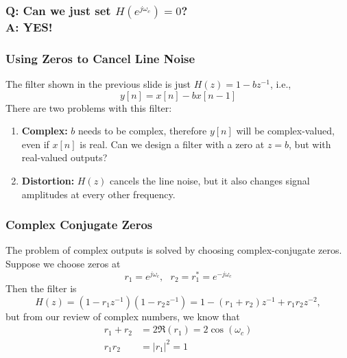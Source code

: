 \documentclass{beamer}
\begin{document}
\begin{frame}
  \frametitle{{\bf Q}: Can we just set $H(e^{j\omega_c})=0$?\\{\bf A: YES!}}
  \centerline{}
\end{frame}  

\begin{frame}
  \frametitle{Using Zeros to Cancel Line Noise}
  The filter shown in the previous slide is just $H(z)=1-bz^{-1}$, i.e.,
  \begin{displaymath}
    y[n] = x[n] - bx[n-1]
  \end{displaymath}
  There are two problems with this filter:
  \begin{enumerate}
  \item {\bf Complex:} $b$ needs to be complex, therefore $y[n]$ will
    be complex-valued, even if $x[n]$ is real.  Can we design a filter
    with a zero at $z=b$, but with real-valued outputs?
  \item {\bf Distortion:} $H(z)$ cancels the line noise, but it also
    changes signal amplitudes at every other frequency.
  \end{enumerate}
\end{frame}

\begin{frame}
  \frametitle{Complex Conjugate Zeros}

  The problem of complex outputs is solved by choosing
  complex-conjugate zeros.  Suppose we choose zeros at
  \begin{displaymath}
    r_1 = e^{j\omega_c},~~~r_2=r_1^*=e^{-j\omega_c}
  \end{displaymath}
  Then the filter is
  \begin{displaymath}
    H(z) = (1-r_1z^{-1})(1-r_2z^{-1}) = 1-(r_1+r_2)z^{-1} + r_1r_2z^{-2},
  \end{displaymath}
  but from our review of complex numbers, we know that
  \begin{align*}
    r_1+r_2 &= 2\Re(r_1) = 2\cos(\omega_c)\\
    r_1r_2 &= |r_1|^2 = 1
  \end{align*}
\end{frame}
\end{document}
